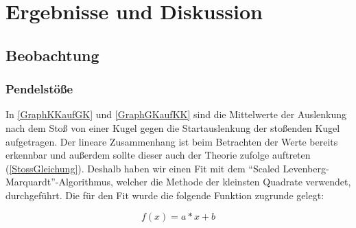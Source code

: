 \documentclass[
	a4paper,
	12pt,
	pagesize,
	ngerman
]{scrartcl}
\begin{document}
	
	\section{Ergebnisse und Diskussion}
	

	\subsection{Beobachtung}

	\subsubsection{Pendelstöße}
	In \cref{GraphKKaufGK} und \cref{GraphGKaufKK} sind die Mittelwerte der Auslenkung nach dem Stoß von einer Kugel gegen die Startauslenkung der stoßenden Kugel aufgetragen.
	Der lineare Zusammenhang ist beim Betrachten der Werte bereits erkennbar und außerdem sollte dieser auch der Theorie zufolge auftreten (\cref{StossGleichung}).
	Deshalb haben wir einen Fit mit dem \enquote{Scaled Levenberg-Marquardt}-Algorithmus, welcher die Methode der kleinsten Quadrate verwendet, durchgeführt.
	Die für den Fit wurde die folgende Funktion zugrunde gelegt: %
	
	\begin{equation}
		f(x)=a*x+b
	\end{equation}
	
\end{document}
